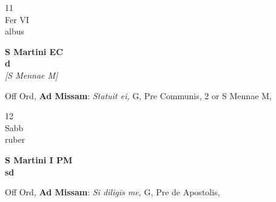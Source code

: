 \documentclass[10pt, openany]{book}
\begin{document}
        \begin{center}
            \begin{minipage}{3.5in}
                \vspace{2em}
                \begin{minipage}{0.5in}
                    {\Huge 11} \\
                    {\normalsize Fer VI} \\
                    {\normalsize albus}
                \end{minipage}
                \begin{minipage}{3.0in}
                    \textbf{ \large S Martini EC \\
                    \textnormal{\normalsize d}} \\ \textit{[S Mennae M]} \\ 
                \end{minipage}
                \begin{justify}Off Ord, \textbf{Ad Missam}: \textit{Statuit ei,} G, Pre Communis, 2 or S Mennae M,   
                \end{justify}
            \end{minipage}
        \end{center}
    
        \begin{center}
            \begin{minipage}{3.5in}
                \vspace{2em}
                \begin{minipage}{0.5in}
                    {\Huge 12} \\
                    {\normalsize Sabb} \\
                    {\normalsize ruber}
                \end{minipage}
                \begin{minipage}{3.0in}
                    \textbf{ \large S Martini I PM \\
                    \textnormal{\normalsize sd}} \\ 
                \end{minipage}
                \begin{justify}Off Ord, \textbf{Ad Missam}: \textit{Si diligis me,} G, Pre de Apostolis,   
                \end{justify}
            \end{minipage}
        \end{center}
    
\end{document}
